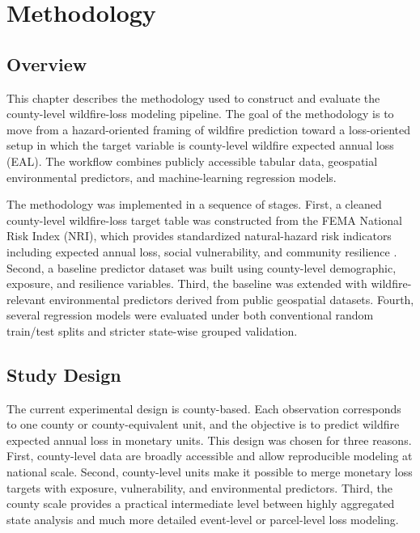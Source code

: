 \chapter{Methodology}
\label{chap:methodology}

\section{Overview}

This chapter describes the methodology used to construct and evaluate the county-level wildfire-loss modeling pipeline. The goal of the methodology is to move from a hazard-oriented framing of wildfire prediction toward a loss-oriented setup in which the target variable is county-level wildfire expected annual loss (EAL). The workflow combines publicly accessible tabular data, geospatial environmental predictors, and machine-learning regression models.

The methodology was implemented in a sequence of stages. First, a cleaned county-level wildfire-loss target table was constructed from the FEMA National Risk Index (NRI), which provides standardized natural-hazard risk indicators including expected annual loss, social vulnerability, and community resilience \citep{fema2025nri_technical,fema2025nri_methodology}. Second, a baseline predictor dataset was built using county-level demographic, exposure, and resilience variables. Third, the baseline was extended with wildfire-relevant environmental predictors derived from public geospatial datasets. Fourth, several regression models were evaluated under both conventional random train/test splits and stricter state-wise grouped validation.

\section{Study Design}

The current experimental design is county-based. Each observation corresponds to one county or county-equivalent unit, and the objective is to predict wildfire expected annual loss in monetary units. This design was chosen for three reasons. First, county-level data are broadly accessible and allow reproducible modeling at national scale. Second, county-level units make it possible to merge monetary loss targets with exposure, vulnerability, and environmental predictors. Third, the county scale provides a practical intermediate level between highly aggregated state analysis and much more detailed event-level or parcel-level loss modeling.


